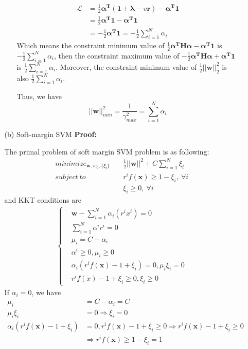 \documentclass{article}
\renewcommand{\b}[1]{\bm{#1}}
\begin{document}
\begin{enumerate}
\begin{enumerate}
\begin{enumerate}
            \begin{align*}
                \mathcal{L} &= \frac{1}{2}\b{\alpha^T}(\b{1+\lambda}-v\b{r})-\b{\alpha^T 1}\\
                &=\frac{1}{2}\b{\alpha^T 1}-\b{\alpha^T 1}\\
                &=-\frac{1}{2}\b{\alpha^T 1}=-\frac{1}{2}\sum_{i=1}^N\alpha_i
            \end{align*}
            Which means the constraint minimum value of $\frac{1}{2}\b{\alpha^T H\alpha}-\b{\alpha^T 1}$ is $-\frac{1}{2}\sum_{i=1}^N\alpha_i$, then the constraint maximum value of $-\frac{1}{2}\b{\alpha^T H\alpha}+\b{\alpha^T 1}$ is $\frac{1}{2}\sum_{i=1}^N\alpha_i$. Moreover, the constraint minimum value of $\frac{1}{2}||\b{w}||_2^2$ is also $\frac{1}{2}\sum_{i=1}^N\alpha_i$.
            \par Thus, we have 
            \[||\b{w}||_{min}^2=\frac{1}{\gamma^2_{max}}=\sum_{i=1}^N\alpha_i\]
        \end{enumerate}
        \item [(b)]Soft-margin SVM\newline
        {\bf Proof:}
        \par The primal problem of soft margin SVM problem is as following:
        \begin{align*}
            minimize_{\b{w},w_0,\{\xi_t\}}\quad & \frac{1}{2}||\b{w}||^2+C\sum_{i=1}^N \xi_i\\
            subject\ to\quad & r^if(\b{x})\geq 1-\xi_i,\ \forall i\\
            & \xi_i\geq 0,\ \forall i
        \end{align*}
        and KKT conditions are
        \begin{align*}
            \left\{\begin{aligned}
                &\b{w}-\sum_{i=1}^N\alpha_i(r^ix^i)=0\\
                &\sum_{i=1}^N\alpha^ir^i=0\\
                &\mu_i=C-\alpha_i\\
                &\alpha^i\geq 0, \mu_i\geq 0\\
                &\alpha_i(r^if(\b{x})-1+\xi_i)=0,\mu_i\xi_i=0\\
                &r^if(x)-1+\xi_i\geq 0,\xi_i\geq 0
            \end{aligned}\right.
        \end{align*}
        If $\alpha_i=0$, we have 
        \begin{align*}
            \mu_i &= C-\alpha_i = C\\
            \mu_i\xi_i&=0\Rightarrow\xi_i=0\\
            \alpha_i(r^if(\b{x})-1+\xi_i)&=0, r^if(\b{x})-1+\xi_i \geq 0 \Rightarrow r^if(\b{x})-1+\xi_i\geq 0\\
            &\Rightarrow r^if(\b{x})\geq 1-\xi_i = 1
        \end{align*}


\end{enumerate}
\end{enumerate}
\end{document}
